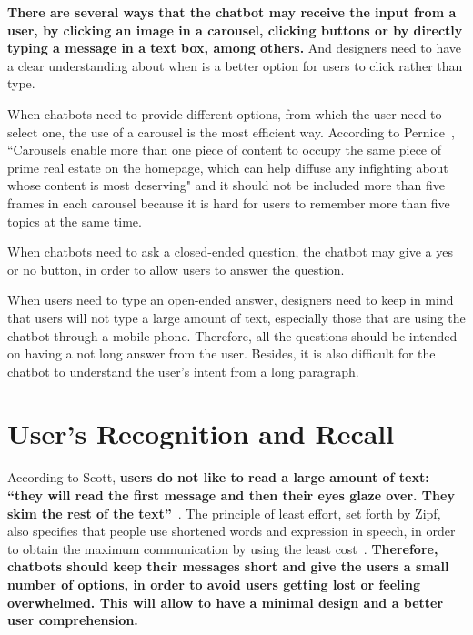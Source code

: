 \documentclass[a4paper,10pt]{article}
\begin{document}
\textbf{There are several ways that the chatbot may receive the input from a user, by clicking an image in a carousel, clicking buttons or by directly typing a message in a text box, among others.} And designers need to have a clear understanding about when is a better option for users to click rather than type. 

When chatbots need to provide different options, from which the user need to select one, the use of a carousel is the most efficient way. According to Pernice~\cite{carousel}, ``Carousels enable more than one piece of content to occupy the same piece of prime real estate on the homepage, which can help diffuse any infighting about whose content is most deserving" and it should not be included more than five frames in each carousel because it is hard for users to remember more than five topics at the same time.

When chatbots need to ask a closed-ended question, the chatbot may give a yes or no button, in order to allow users to answer the question. 

When users need to type an open-ended answer, designers need to keep in mind that users will not type a large amount of text, especially those that are using the chatbot through a mobile phone. Therefore, all the questions should be intended on having a not long answer from the user. Besides, it is also difficult for the chatbot to understand the user's intent from a long paragraph. 

 
\section{User's Recognition and Recall}

According to Scott, \textbf{users do not like to read a large amount of text: ``they will read the first message and then their eyes glaze over. They skim the rest of the text”}~\cite{HeuristicsWebPage}. The principle of least effort, set forth by Zipf, also specifies that people use shortened words and expression in speech, in order to obtain the maximum communication by using the least cost~\cite{zipf2016human}. \textbf{Therefore, chatbots should keep their messages short and give the users a small number of options, in order to avoid users getting lost or feeling overwhelmed. This will allow to have a minimal design and a better user comprehension.}
\end{document}
